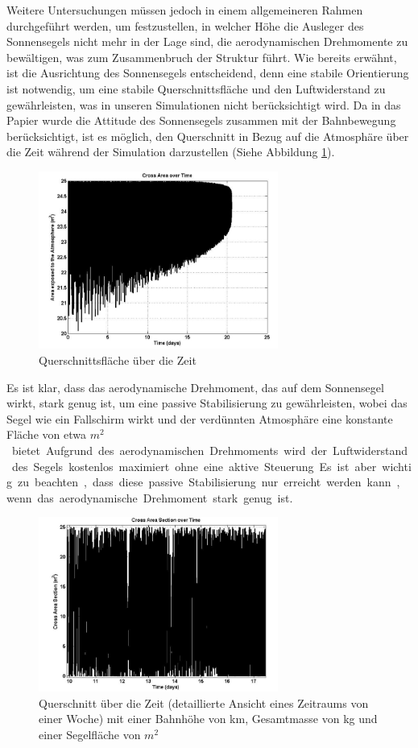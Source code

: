 Weitere Untersuchungen müssen jedoch in einem allgemeineren Rahmen durchgeführt werden, um festzustellen, in welcher Höhe die Ausleger des Sonnensegels nicht mehr in der Lage sind, die aerodynamischen Drehmomente zu bewältigen, was zum Zusammenbruch der Struktur führt. Wie bereits erwähnt, ist die Ausrichtung des Sonnensegels entscheidend, denn eine stabile Orientierung ist notwendig, um eine stabile Querschnittsfläche und den Luftwiderstand zu gewährleisten, was in unseren Simulationen nicht berücksichtigt wird. Da in das Papier wurde die Attitude des Sonnensegels zusammen mit der Bahnbewegung berücksichtigt, ist es möglich, den Querschnitt in Bezug auf die Atmosphäre über die Zeit während der Simulation darzustellen (Siehe Abbildung \ref{Attitude_Paper}).
\begin{figure}[htbp]
	\centering
	\includegraphics[width=0.7\textwidth]{bilder/Attitude_Paper.png}
	\caption{Querschnittsfläche über die Zeit}
	\label{Attitude_Paper}
\end{figure}
\clearpage
Es ist klar, dass das aerodynamische Drehmoment, das auf dem Sonnensegel wirkt, stark genug ist, um eine passive Stabilisierung zu gewährleisten, wobei das Segel wie ein Fallschirm wirkt und der verdünnten Atmosphäre eine konstante Fläche von etwa \unit[24]{$m^2$} bietet. Aufgrund des aerodynamischen Drehmoments wird der Luftwiderstand des Segels kostenlos maximiert ohne eine aktive Steuerung. Es ist aber wichtig zu beachten, dass diese passive Stabilisierung nur erreicht werden kann, wenn das aerodynamische Drehmoment stark genug ist. 
\begin{figure}[htbp]
	\centering
	\includegraphics[width=0.7\textwidth]{bilder/Attitude2_Paper.png}
	\caption{Querschnitt über die Zeit (detaillierte Ansicht eines Zeitraums von einer Woche) mit einer Bahnhöhe von \unit[600]{km},  Gesamtmasse von \unit[140]{kg} und einer Segelfläche von \unit[25]{$m^2$}}
	\label{Attitude2_Paper}
\end{figure}

